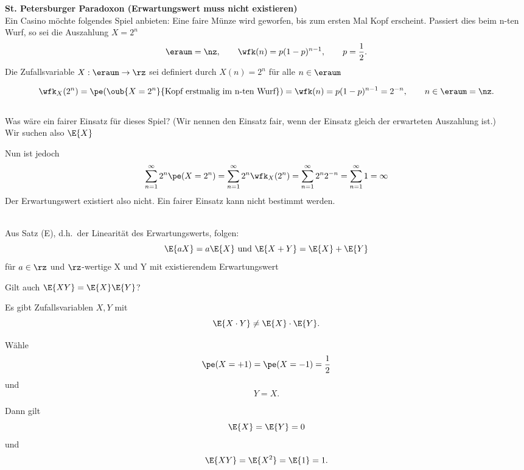 \begin{bsp}
    \textbf{St. Petersburger Paradoxon (Erwartungswert muss nicht existieren)}  \\
    Ein Casino möchte folgendes Spiel anbieten:
    Eine faire Münze wird geworfen, bis zum ersten Mal Kopf erscheint.
    Passiert dies beim n-ten Wurf, so sei die Auszahlung $X = 2^n$
    \[
        \eraum=\nz,
        \qquad
        \wfk(n)=p(1-p)^{n-1},
        \qquad
        p=\frac12.
    \]
    Die Zufallsvariable $X:\eraum\to\rz$ sei definiert durch $ X(n)=2^n$  für alle $n\in\eraum$

    \[
        \wfk_X(2^n)
        =
        \pe( \oub{X=2^n}{\text{Kopf erstmalig im n-ten Wurf}} )
        =
        \wfk(n)
        =
        p(1-p)^{n-1}
        =
        2^{-n},
        \qquad
        n\in \eraum = \nz.
    \]
     \\
    Was wäre ein fairer Einsatz für dieses Spiel?
    (Wir nennen den Einsatz fair, wenn der Einsatz gleich der erwarteten Auszahlung ist.) \\
    Wir suchen also $\E{X}$


    Nun ist jedoch
    \[
        \sum_{n=1}^{\infty} 2^n \pe(X=2^n) = \sum_{n=1}^{\infty} 2^n \wfk_X(2^n) = \sum_{n=1}^{\infty} 2^n 2^{-n} = \sum_{n=1}^{\infty} 1 = \infty
    \]
    Der Erwartungswert existiert also nicht.
    Ein fairer Einsatz kann nicht bestimmt werden.
\end{bsp}
\begin{er}  \\
    Aus Satz (E), d.h.\ der Linearität des Erwartungswerts, folgen: %
    \[
        \E{aX}= a \E{X} \text{ und } \E{X + Y } = \E{X} + \E{Y}
    \]
    für $a \in \rz$ und $\rz$-wertige X und Y mit existierendem Erwartungswert
\end{er}

\begin{fr} 
Gilt auch \(\E{XY}  = \E{X}  \E{Y}\)? \\
\end{fr}
\begin{bsp} 
Es gibt Zufallsvariablen \(X,Y\) mit
    \[
        \E{X\cdot Y} \neq \E{X}\cdot\E{Y}.
    \]

    Wähle
    \[
        \pe(X=+1)=\pe(X=-1)=\frac{1}{2}
    \]
    und
    \[
        Y=X.
    \]

    Dann gilt
    \[
        \E{X}
        =
        \E{Y}
        =
        0
    \]
    und
    \[
        \E{XY}
        =
        \E{X^2}
        =
        \E{1}
        =
        1.
    \]
\end{bsp}

